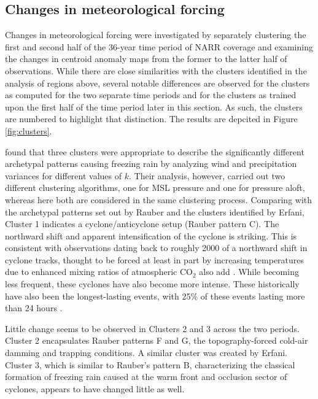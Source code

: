 \documentclass[twocol]{ametsoc}
\begin{document}
\subsection{Changes in meteorological forcing}
Changes in meteorological forcing were investigated by separately clustering the first and second half of the 36-year time period of NARR coverage and examining the changes in centroid anomaly maps from the former to the  latter half of observations. While there are close similarities with the clusters identified in the analysis of regions above, several notable differences are observed for the clusters as computed for the two separate time periods and for the clusters as trained upon the first half of the time period later in this section. As such, the clusters are numbered to highlight that distinction. The results are depcited in Figure \ref{fig:clusters}.

\citet{erfani2012automated} found that three clusters were appropriate to describe the significantly different archetypal patterns causing freezing rain by analyzing wind and precipitation variances for different values of $k$. Their analysis, however, carried out two different clustering algorithms, one for MSL pressure and one for pressure aloft, whereas here both are considered in the same clustering process. 
Comparing with the archetypal patterns set out by Rauber and the clusters identified by Erfani, Cluster 1 indicates a cyclone/anticyclone setup (Rauber pattern C). The northward shift and apparent intensification of the cyclone is striking. This is consistent with observations dating back to roughly 2000 of a northward shift in cyclone tracks, thought to be forced at least in part by increasing temperatures due to enhanced mixing ratios of atmospheric CO$_2$ \citep{mccabe2001trends} also add \citep{chang2016northern}. While becoming less frequent, these cyclones have also become more intense. These historically have also been the longest-lasting events, with 25\% of these events lasting more than 24 hours \citep{rauber2001synoptic}. 

Little change seems to be observed in Clusters 2 and 3 across the two periods. Cluster 2 encapsulates Rauber patterns F and G, the topography-forced cold-air damming and trapping conditions. A similar cluster was created by Erfani. Cluster 3, which is similar to Rauber's pattern B, characterizing the classical formation of freezing rain caused at the warm front and occlusion sector of cyclones, appears to have changed little as well.
\end{document}
